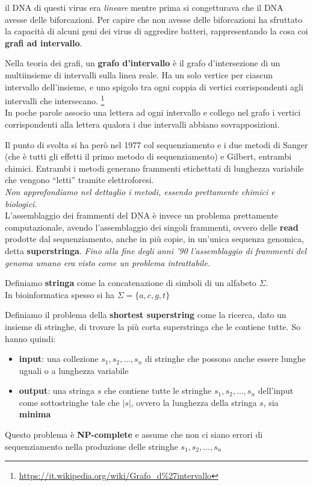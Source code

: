 \documentclass[a4paper,12pt, oneside]{book}
\begin{document}
il DNA di questi virus era \textit{lineare} mentre prima si congetturava che il
DNA avesse delle biforcazioni. Per capire che non avesse delle biforcazioni ha
sfruttato la capacità di alcuni geni dei virus di aggredire batteri,
rappresentando la cosa coi \textbf{grafi ad intervallo}.
\begin{definizione}
  Nella teoria dei grafi, un \textbf{grafo d'intervallo} è il grafo
  d'intersezione di un 
  multiinsieme di intervalli sulla linea reale. Ha un solo vertice per ciascun
  intervallo dell'insieme, e uno spigolo tra ogni coppia di vertici
  corrispondenti agli intervalli che
  intersecano.
  \footnote{\url{https://it.wikipedia.org/wiki/Grafo\_d\%27intervallo}}\\
  In poche parole associo una lettera ad ogni intervallo e collego nel grafo i
  vertici corrispondenti alla lettera qualora i due intervalli abbiano
  sovrapposizioni.
\end{definizione}
Il punto di svolta si ha però nel 1977 col sequenziamento e i due metodi di
Sanger (che è tutti gli effetti il primo metodo di sequenziamento) e Gilbert,
entrambi chimici. Entrambi i metodi generano frammenti etichettati di lunghezza
variabile che vengono ``letti'' tramite elettroforesi. \\
\textit{Non approfondiamo nel dettaglio i metodi, essendo prettamente chimici e
  biologici}.\\ 
L'assemblaggio dei frammenti del DNA è invece un problema prettamente
computazionale, avendo l'assemblaggio dei singoli frammenti, ovvero delle
\textbf{read} prodotte dal sequenziamento, anche in più copie, in un'unica
sequenza genomica, detta \textbf{superstringa}. \textit{Fino alla fine degli
  anni '90 l'assemblaggio di frammenti del genoma umano era visto come un
  problema intrattabile.}
\begin{definizione}
  Definiamo \textbf{stringa} come la concatenazione di simboli di un alfabeto
  $\Sigma$.\\
  In bioinformatica spesso si ha $\Sigma=\{a,c,g,t\}$
\end{definizione}
\begin{definizione}
  Definiamo il problema della \textbf{shortest superstring} come la ricerca,
  dato un insieme di stringhe, di trovare la più corta superstringa che le
  contiene tutte. So hanno quindi:
  \begin{itemize}
    \item \textbf{input}: una collezione $s_1,s_2,\ldots,s_n$ di stringhe che
    possono anche essere lunghe uguali o a lunghezza variabile
    \item \textbf{output}: una stringa $s$ che contiene tutte le stringhe
    $s_1,s_2,\ldots,s_n$ dell'input come sottostringhe tale che $|s|$, ovvero la
    lunghezza della stringa $s$, sia \textbf{minima}
  \end{itemize}
  Questo problema è \textbf{NP-complete} e assume che non ci siano errori di
  sequenziamento nella produzione delle stringhe $s_1,s_2,\ldots,s_n$
\end{definizione}
\end{document}
